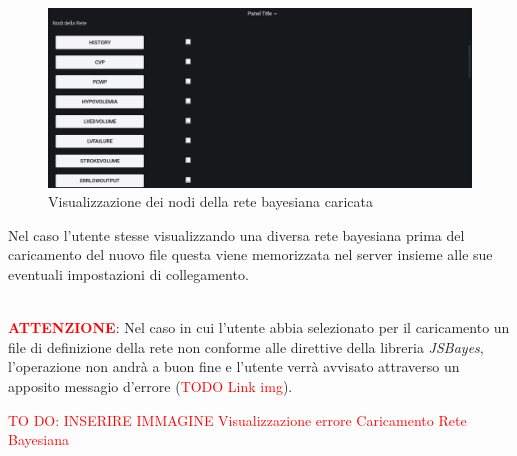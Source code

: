 \begin{figure}[H]
	\begin{center}
		\includegraphics[scale=0.35]{./images/NodiRete.png}
		 \caption{Visualizzazione dei nodi della rete bayesiana caricata}	
		 \label{NodiRete}
	\end{center}
\end{figure}

Nel caso l'utente stesse visualizzando una diversa rete bayesiana prima del caricamento del nuovo file questa viene memorizzata nel server insieme alle sue eventuali impostazioni di collegamento.

~\\
\textbf{\textcolor{red}{ATTENZIONE}}: Nel caso in cui l'utente abbia selezionato per il caricamento un file di definizione della rete non conforme alle direttive della libreria \textit{JSBayes}, l'operazione non andrà a buon fine e l'utente verrà avvisato attraverso un apposito messagio d'errore (\textcolor{red}{TODO Link img}).

\textcolor{red}{TO DO: INSERIRE IMMAGINE Visualizzazione errore Caricamento Rete Bayesiana} 

